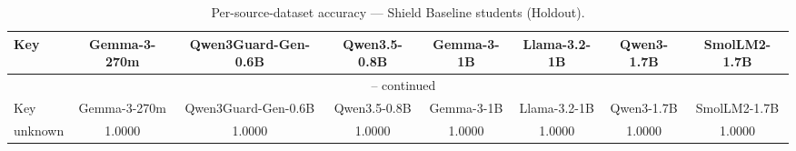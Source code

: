 \begin{landscape}
\begin{longtable}{lccccccc}
\caption{Per-source-dataset accuracy — Shield Baseline students (Holdout).} \\
\label{tab:students_baseline_per_dataset_holdout}
\toprule
Key & Gemma-3-270m & Qwen3Guard-Gen-0.6B & Qwen3.5-0.8B & Gemma-3-1B & Llama-3.2-1B & Qwen3-1.7B & SmolLM2-1.7B \\
\midrule
\endfirsthead
\multicolumn{8}{c}{\tablename\ \thetable{} -- continued} \\
\toprule
Key & Gemma-3-270m & Qwen3Guard-Gen-0.6B & Qwen3.5-0.8B & Gemma-3-1B & Llama-3.2-1B & Qwen3-1.7B & SmolLM2-1.7B \\
\midrule
\endhead
unknown & 1.0000 & 1.0000 & 1.0000 & 1.0000 & 1.0000 & 1.0000 & 1.0000 \\
\bottomrule
\end{longtable}
\end{landscape}